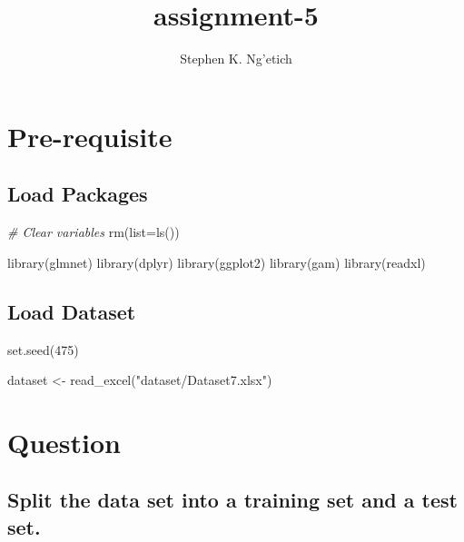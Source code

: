 \documentclass[
]{article}
\title{assignment-5}
\author{Stephen K. Ng'etich}
\date{}
\newenvironment{Shaded}{\begin{snugshade}}{\end{snugshade}}
\newcommand{\AttributeTok}[1]{\textcolor[rgb]{0.77,0.63,0.00}{#1}}
\newcommand{\CommentTok}[1]{\textcolor[rgb]{0.56,0.35,0.01}{\textit{#1}}}
\newcommand{\DecValTok}[1]{\textcolor[rgb]{0.00,0.00,0.81}{#1}}
\newcommand{\FunctionTok}[1]{\textcolor[rgb]{0.00,0.00,0.00}{#1}}
\newcommand{\NormalTok}[1]{#1}
\newcommand{\OtherTok}[1]{\textcolor[rgb]{0.56,0.35,0.01}{#1}}
\newcommand{\StringTok}[1]{\textcolor[rgb]{0.31,0.60,0.02}{#1}}
\begin{document}
\maketitle

\hypertarget{pre-requisite}{%
\section{Pre-requisite}\label{pre-requisite}}

\hypertarget{load-packages}{%
\subsection{Load Packages}\label{load-packages}}

\begin{Shaded}
\begin{Highlighting}[]
\CommentTok{\# Clear variables}
\FunctionTok{rm}\NormalTok{(}\AttributeTok{list=}\FunctionTok{ls}\NormalTok{())}

\FunctionTok{library}\NormalTok{(glmnet)}
\FunctionTok{library}\NormalTok{(dplyr)}
\FunctionTok{library}\NormalTok{(ggplot2)}
\FunctionTok{library}\NormalTok{(gam)}
\FunctionTok{library}\NormalTok{(readxl)}
\end{Highlighting}
\end{Shaded}

\hypertarget{load-dataset}{%
\subsection{Load Dataset}\label{load-dataset}}

\begin{Shaded}
\begin{Highlighting}[]
\FunctionTok{set.seed}\NormalTok{(}\DecValTok{475}\NormalTok{)                              }

\NormalTok{dataset }\OtherTok{\textless{}{-}} \FunctionTok{read\_excel}\NormalTok{(}\StringTok{"dataset/Dataset7.xlsx"}\NormalTok{)}
\end{Highlighting}
\end{Shaded}

\hypertarget{question}{%
\section{Question}\label{question}}

\hypertarget{split-the-data-set-into-a-training-set-and-a-test-set.}{%
\subsection{Split the data set into a training set and a test
set.}\label{split-the-data-set-into-a-training-set-and-a-test-set.}}
\end{document}
